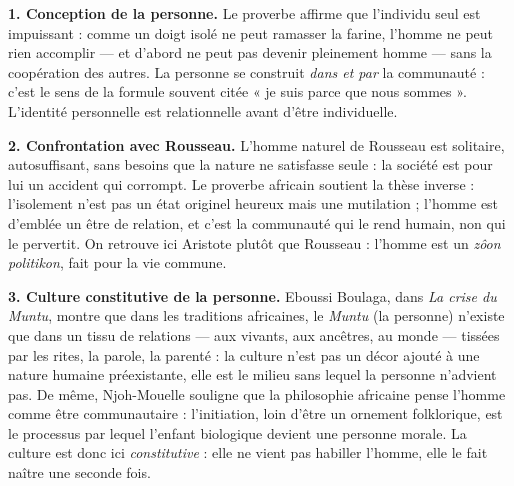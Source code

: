 \documentclass[11pt]{article}
\begin{document}
\begin{corrige}
\textbf{1. Conception de la personne.} Le proverbe affirme que l'individu seul est impuissant : comme un doigt isolé ne peut ramasser la farine, l'homme ne peut rien accomplir — et d'abord ne peut pas devenir pleinement homme — sans la coopération des autres. La personne se construit \emph{dans et par} la communauté : c'est le sens de la formule souvent citée « je suis parce que nous sommes ». L'identité personnelle est relationnelle avant d'être individuelle.

\textbf{2. Confrontation avec Rousseau.} L'homme naturel de Rousseau est solitaire, autosuffisant, sans besoins que la nature ne satisfasse seule : la société est pour lui un accident qui corrompt. Le proverbe africain soutient la thèse inverse : l'isolement n'est pas un état originel heureux mais une mutilation ; l'homme est d'emblée un être de relation, et c'est la communauté qui le rend humain, non qui le pervertit. On retrouve ici Aristote plutôt que Rousseau : l'homme est un \emph{zôon politikon}, fait pour la vie commune.

\textbf{3. Culture constitutive de la personne.} Eboussi Boulaga, dans \emph{La crise du Muntu}, montre que dans les traditions africaines, le \emph{Muntu} (la personne) n'existe que dans un tissu de relations — aux vivants, aux ancêtres, au monde — tissées par les rites, la parole, la parenté : la culture n'est pas un décor ajouté à une nature humaine préexistante, elle est le milieu sans lequel la personne n'advient pas. De même, Njoh-Mouelle souligne que la philosophie africaine pense l'homme comme être communautaire : l'initiation, loin d'être un ornement folklorique, est le processus par lequel l'enfant biologique devient une personne morale. La culture est donc ici \emph{constitutive} : elle ne vient pas habiller l'homme, elle le fait naître une seconde fois.
\end{corrige}
\end{document}
